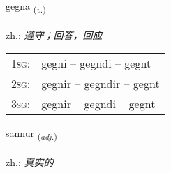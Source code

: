 \documentclass[frontgrid, backgrid]{flacards}\usepackage[]{graphicx}\usepackage[]{xcolor}
\begin{document}
\renewcommand{\flhead}{\vskip5pt \fboxsep=0pt {\small\bfseries\footnotesize Sagnorð | 动词}}
\renewcommand{\fcfoot}{\vskip5pt \fboxsep=0pt \hspace{2pt}{\small\bfseries\footnotesize 1K}}

\renewcommand{\blhead}{\vskip5pt {\small\bfseries\footnotesize Sagnorð | 动词 }}
\renewcommand{\bcfoot}{\vskip5pt \hspace{2pt}{\small\bfseries\footnotesize 1K}}


{gegna \small{\textsubscript{(\textit{v.})}} \\[1ex] %
\textphonetic{[cɛkna]} \\
zh.: \emph{遵守；回答，回应} \\  [2ex]
\renewcommand*{\arraystretch}{0.8}
\begin{tabular}{p{1cm}l}
\textsc{1sg}: & gegni -- gegndi -- gegnt \\ 
\textsc{2sg}: & gegnir -- gegndir -- gegnt \\ 
\textsc{3sg}: & gegnir -- gegndi -- gegnt \\ 
\end{tabular}
}

\renewcommand{\flhead}{\vskip5pt \fboxsep=0pt {\small\bfseries\footnotesize Lýsingarorð | 形容词}}
\renewcommand{\fcfoot}{\vskip5pt \fboxsep=0pt \hspace{2pt}{\small\bfseries\footnotesize 1K}}

\renewcommand{\blhead}{\vskip5pt {\small\bfseries\footnotesize Lýsingarorð | 形容词 }}
\renewcommand{\bcfoot}{\vskip5pt \hspace{2pt}{\small\bfseries\footnotesize 1K}}


{sannur \small{\textsubscript{(\textit{adj.})}} \\[1ex] %
\textphonetic{[sanʏr]} \\
zh.: \emph{真实的} \\  [2ex]
\renewcommand*{\arraystretch}{0.8}
}
\end{document}

